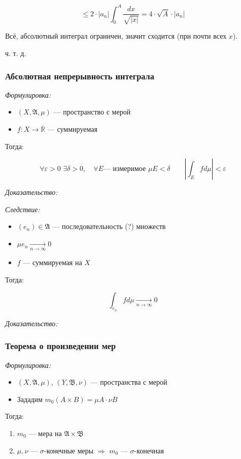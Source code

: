 \documentclass{article}
\def\dbl{\,\,}
\def\rinf{\overline{\mathbb{R}}}
\def\goesto#1{\underset{#1}{\longrightarrow}}
\def\toinf#1{\goesto{#1 \rightarrow \infty}}
\def\ntoinf{\toinf{n}}
\begin{document}
\[ \le 2 \cdot |a_n| \int_{0}^{A}\frac{dx}{\sqrt{|x|}} = 4 \cdot \sqrt{A} \cdot |a_n|\]

Всё, абсолютный интеграл ограничен, значит сходится (при почти всех $x$).

ч. т. д. 

\subsubsection{Абсолютная непрерывность интеграла}
\textit{Формулировка:}

\begin{itemize}
    \item $(X, \mathfrak{A}, \mu)$ --- пространство с мерой
    \item $f: X \rightarrow \rinf$ --- суммируемая
\end{itemize}

Тогда:

\[\forall \varepsilon > 0 \dbl \exists \delta > 0, \quad \forall E\text{--- измеримое} \dbl \mu E < \delta \qquad \left|\int_{E} f d \mu\right| < \varepsilon\]

\textit{Доказательство:}

\textit{Следствие:}
\begin{itemize}
    \item $(e_n) \in \mathfrak{A}$ --- последовательность (?) множеств\
    \item $\mu e_n \ntoinf 0$
    \item $f$ --- суммируемая на $X$
\end{itemize}

Тогда:

\[\int_{e_n} f d \mu \ntoinf 0\]

\textit{Доказательство:}

\subsubsection{Теорема о произведении мер}
\textit{Формулировка:}

\begin{itemize}
    \item $(X, \mathfrak{A}, \mu)$, $(Y, \mathfrak{B}, \nu)$ --- пространства с мерой
    \item Зададим $m_0(A \times B) = \mu A \cdot \nu B$
\end{itemize}

Тогда:

\begin{enumerate}
    \item $m_0$ --- мера на $\mathfrak{A} \times \mathfrak{B}$
    \item $\mu, \nu$ --- $\sigma$-конечные меры $\Longrightarrow$ $m_0$ --- $\sigma$-конечная
\end{enumerate}
\end{document}
